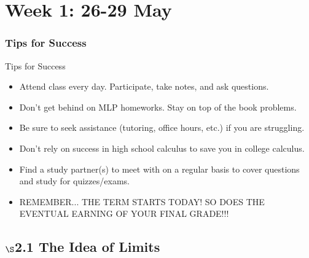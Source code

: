 \documentclass[cal1spr16Lectures.tex]{subfiles}
\begin{document}
\section[Week 1]{Week 1: 26-29 May}


\subsubsection{Tips for Success}
\begin{frame}{Tips for Success}\footnotesize
\begin{itemize}
\item Attend class every day.  \alert{Participate}, take notes, and ask questions.
\item Don't get behind on MLP homeworks.  Stay on top of the book problems.
\item Be sure to seek assistance (tutoring, office hours, etc.) if you are struggling.
\item Don't rely on success in high school calculus to save you in college calculus.
\item Find a study partner(s) to meet with on a regular basis to cover questions and study for quizzes/exams.
\item REMEMBER... THE TERM STARTS TODAY!  SO DOES THE EVENTUAL EARNING OF YOUR FINAL GRADE!!!
\end{itemize}
\end{frame}

\subsection[2.1 The Idea of Limits]{$\S$2.1 The Idea of Limits}
\end{document}
